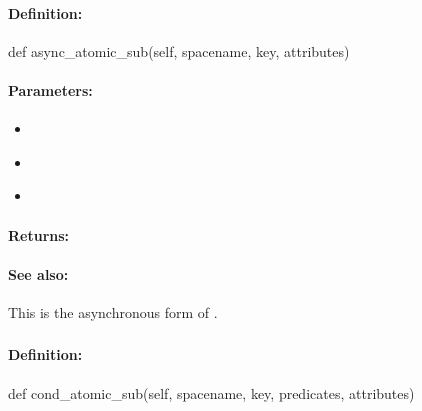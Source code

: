 \paragraph{Definition:}
\begin{pythoncode}
def async_atomic_sub(self, spacename, key, attributes)
\end{pythoncode}

\paragraph{Parameters:}
\begin{itemize}[noitemsep]
\item {}\\

\item {}\\

\item {}\\

\end{itemize}

\paragraph{Returns:}


\paragraph{See also:}  This is the asynchronous form of .

\pagebreak
\subsubsection{}
\label{api:python:cond_atomic_sub}


\paragraph{Definition:}
\begin{pythoncode}
def cond_atomic_sub(self, spacename, key, predicates, attributes)
\end{pythoncode}

